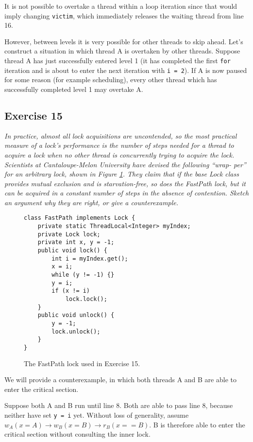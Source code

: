 \documentclass[a4paper,10pt]{article}
\begin{document}
It is not possible to overtake a thread within a loop iteration since that would
imply changing \lstinline|victim|, which immediately releases the waiting thread
from line 16.

However, between levels it is very possible for other threads to skip ahead.
Let's construct a situation in which thread A is overtaken by other threads.
Suppose thread A has just successfully entered level 1 (it has completed the first
\lstinline|for| iteration and is about to enter the next iteration with \lstinline|i = 2|).
If A is now paused for some reason (for example scheduling), every other thread
which has successfully completed level 1 may overtake A.

\subsection{Exercise 15}

\emph{In practice, almost all lock acquisitions are uncontended, so the most
practical measure of a lock’s performance is the number of steps needed for a
thread to acquire a lock when no other thread is concurrently trying to acquire
the lock.
Scientists at Cantaloupe-Melon University have devised the following ``wrap-
per'' for an arbitrary lock, shown in Figure \ref{fig:fastpath}. They claim that if the base Lock class
provides mutual exclusion and is starvation-free, so does the FastPath lock, but
it can be acquired in a constant number of steps in the absence of contention.
Sketch an argument why they are right, or give a counterexample.}

\vspace{3mm}

\begin{figure}
\begin{lstlisting}
class FastPath implements Lock {
    private static ThreadLocal<Integer> myIndex;
    private Lock lock;
    private int x, y = -1;
    public void lock() {
        int i = myIndex.get();
        x = i;
        while (y != -1) {}
        y = i;
        if (x != i)
            lock.lock();
    }
    public void unlock() {
        y = -1;
        lock.unlock();
    }
}
\end{lstlisting}
\caption{The FastPath lock used in Exercise 15.}
\label{fig:fastpath}
\end{figure}

We will provide a counterexample, in which both threads A and B are able to enter
the critical section.

Suppose both A and B run until line 8. Both are able to pass line 8, because neither
have set \lstinline|y = i| yet. Without loss of generality, assume
$w_A(x = A) \rightarrow w_B(x = B) \rightarrow r_B(x == B)$. B is therefore
able to enter the critical section without consulting the inner lock.
\end{document}
